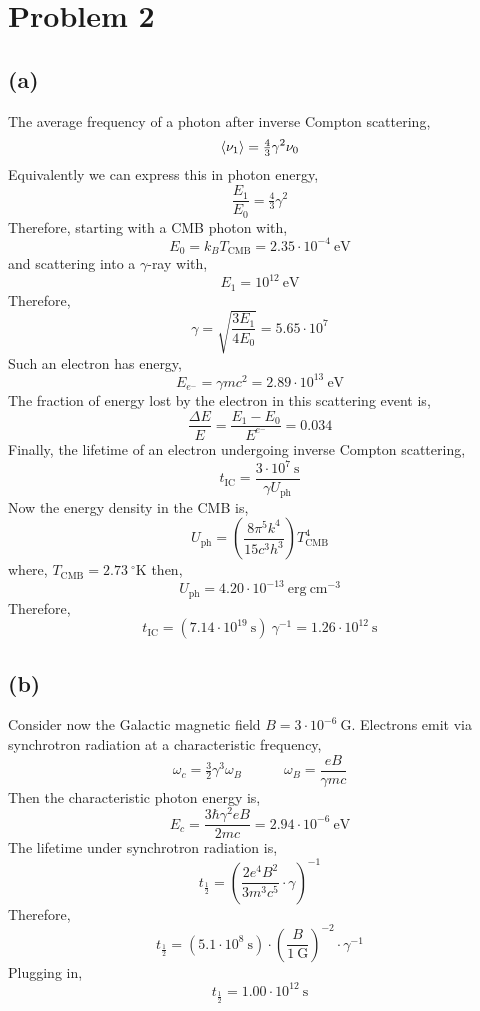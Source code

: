\documentclass[12pt]{article}
\begin{document}
\section{Problem 2}

\subsection*{(a)}

The average frequency of a photon after inverse Compton scattering,
\[ \left< \nu_1 \right> = \tfrac{4}{3} \gamma^2 \nu_0 \]
Equivalently we can express this in photon energy,
\[ \frac{E_1}{E_0} = \tfrac{4}{3} \gamma^2 \]
Therefore, starting with a CMB photon with, 
\[ E_0 = k_B T_{\mathrm{CMB}} = 2.35 \cdot 10^{-4} \: \mathrm{eV}  \]
and scattering into a $\gamma$-ray with,
\[ E_1 = 10^{12} \: \mathrm{eV} \]
Therefore,
\[ \gamma = \sqrt{\frac{3 E_1}{4 E_0}} = 5.65 \cdot 10^{7} \]
Such an electron has energy,
\[ E_{e^{-}} = \gamma m c^2 = 2.89 \cdot 10^{13} \: \mathrm{eV} \]
The fraction of energy lost by the electron in this scattering event is,
\[ \frac{\Delta E}{E} = \frac{E_1 - E_0}{E^{e^{-}}} = 0.034 \]
Finally, the lifetime of an electron undergoing inverse Compton scattering,
\[ t_{\mathrm{IC}} = \frac{3 \cdot 10^7 \: \mathrm{s}}{\gamma U_{\text{ph}}} \]
Now the energy density in the CMB is,
\[ U_{\text{ph}} = \left( \frac{8 \pi^5 k^4}{15 c^3 h^3} \right) T_{\text{CMB}}^4 \]
where, $T_{\text{CMB}} = 2.73 \: ^\circ \mathrm{K}$ then,
\[ U_{\text{ph}} = 4.20 \cdot 10^{-13} \: \mathrm{erg} \: \mathrm{cm}^{-3} \] 
Therefore,
\[ t_{\mathrm{IC}} = (7.14 \cdot 10^{19} \: \mathrm{s}) \: \gamma^{-1} = 1.26 \cdot 10^{12} \: \mathrm{s} \]

\subsection*{(b)}

Consider now the Galactic magnetic field $B = 3 \cdot 10^{-6} \: \mathrm{G}$. Electrons emit via synchrotron radiation at a characteristic frequency,
\[ \omega_c = \tfrac{3}{2} \gamma^3 \omega_B \quad \quad \quad \omega_B = \frac{e B}{\gamma m c} \]
Then the characteristic photon energy is,
\[ E_c = \frac{3 \hbar \gamma^2 e B}{2 m  c} = 2.94 \cdot 10^{-6} \: \mathrm{eV} \]
The lifetime under synchrotron radiation is,
\[ t_{\frac{1}{2}} = \left( \frac{2 e^4 B^2}{3 m^3 c^5} \cdot \gamma \right)^{-1} \]
Therefore,
\[ t_{\frac{1}{2}} = (5.1 \cdot 10^8 \: \mathrm{s}) \cdot \left( \frac{B}{1 \: \mathrm{G}} \right)^{-2} \cdot \gamma^{-1} \]  
Plugging in,
\[ t_{\frac{1}{2}} = 1.00 \cdot 10^{12} \: \mathrm{s} \]
\end{document}
